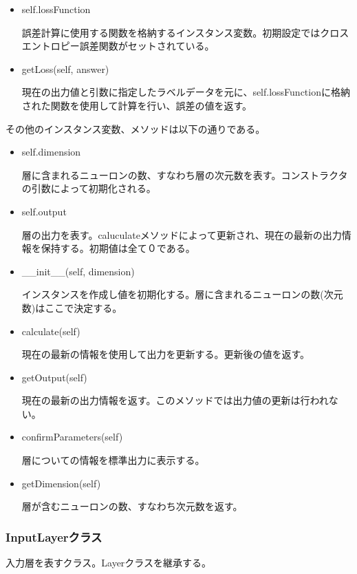 \documentclass{ujarticle} %
\begin{document}
\begin{itemize}
  \item self.lossFunction

  誤差計算に使用する関数を格納するインスタンス変数。初期設定ではクロスエントロピー誤差関数がセットされている。

  \item getLoss(self, answer)

  現在の出力値と引数に指定したラベルデータを元に、self.lossFunctionに格納された関数を使用して計算を行い、誤差の値を返す。

\end{itemize}

その他のインスタンス変数、メソッドは以下の通りである。

\begin{itemize}
  \item self.dimension

  層に含まれるニューロンの数、すなわち層の次元数を表す。コンストラクタの引数によって初期化される。

  \item self.output

  層の出力を表す。caluculateメソッドによって更新され、現在の最新の出力情報を保持する。初期値は全て０である。

  \item \_\_init\_\_(self, dimension)

  インスタンスを作成し値を初期化する。層に含まれるニューロンの数(次元数)はここで決定する。

  \item calculate(self)

  現在の最新の情報を使用して出力を更新する。更新後の値を返す。

  \item getOutput(self)

  現在の最新の出力情報を返す。このメソッドでは出力値の更新は行われない。

  \item confirmParameters(self)

  層についての情報を標準出力に表示する。

  \item getDimension(self)

  層が含むニューロンの数、すなわち次元数を返す。
\end{itemize}

\subsubsection{InputLayerクラス}
入力層を表すクラス。Layerクラスを継承する。
\end{document}
